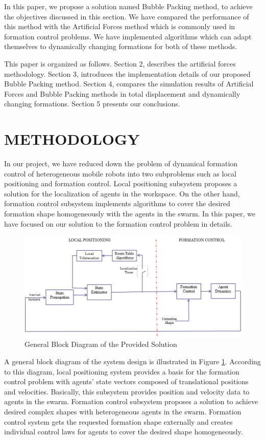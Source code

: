 \documentclass[letterpaper, 10 pt, conference]{ieeeconf}  %
\begin{document}
In this paper, we propose a solution named Bubble Packing method, to achieve the objectives discussed in this section. We have compared the performance of this method with the Artificial Forces method which is commonly used in formation control problems. We have implemented algorithms which can adapt themselves to dynamically changing formations for both of these methods.

This paper is organized as follows. Section 2, describes the artificial forces methodology. Section 3, introduces the implementation details of our proposed Bubble Packing method. Section 4, compares the simulation results of Artificial Forces and Bubble Packing methods in total displacement and dynamically changing formations. Section 5 presents our conclusions.

\section{METHODOLOGY}
In our project, we have reduced down the problem of dynamical formation control of heterogeneous mobile robots into two subproblems such as local positioning and formation control. Local positioning subsystem proposes a solution for the localization of agents in the workspace. On the other hand, formation control subsystem implements algorithms to cover the desired formation shape homogeneously with the agents in the swarm. In this paper, we have focused on our solution to the formation control problem in details.

\begin{figure}[thpb]
\centering
\includegraphics[scale = 0.35]{general_scheme}
\caption{General Block Diagram of the Provided Solution} \label{general_system}
\end{figure}

A general block diagram of the system design is illustrated in Figure \ref{general_system}. According to this diagram, local positioning system provides a basis for the formation control problem with agents’ state vectors composed of translational positions and velocities. Basically, this subsystem provides position and velocity data to agents in the swarm. Formation control subsystem proposes a solution to achieve desired complex shapes with heterogeneous agents in the swarm. Formation control
system gets the requested formation shape externally and creates individual control laws for agents to cover the desired shape homogeneously. 
\end{document}

